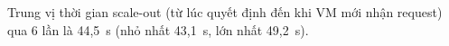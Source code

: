Trung vị thời gian scale-out (từ lúc quyết định đến khi VM mới nhận request) qua 6 lần là 44,5~s (nhỏ nhất 43,1~s, lớn nhất 49,2~s).